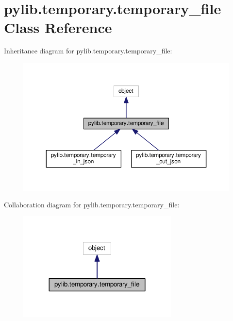 \hypertarget{classpylib_1_1temporary_1_1temporary__file}{}\section{pylib.\+temporary.\+temporary\+\_\+file Class Reference}
\label{classpylib_1_1temporary_1_1temporary__file}


Inheritance diagram for pylib.\+temporary.\+temporary\+\_\+file\+:
\nopagebreak
\begin{figure}[H]
\begin{center}
\leavevmode
\includegraphics[width=350pt]{classpylib_1_1temporary_1_1temporary__file__inherit__graph}
\end{center}
\end{figure}


Collaboration diagram for pylib.\+temporary.\+temporary\+\_\+file\+:
\nopagebreak
\begin{figure}[H]
\begin{center}
\leavevmode
\includegraphics[width=228pt]{classpylib_1_1temporary_1_1temporary__file__coll__graph}
\end{center}
\end{figure}
